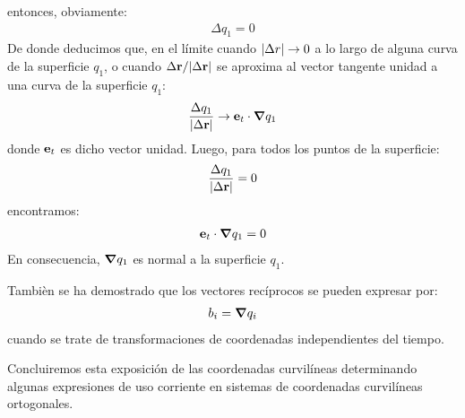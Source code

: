 \documentclass[12pt]{article}
\begin{document}
entonces, obviamente:
\begin{align*}
    \Delta q_{1} = 0
\end{align*}
De donde deducimos que, en el límite cuando $\abs{\Delta r} \to 0$ a lo largo de alguna curva de la superficie $q_{1}$, o cuando $\Delta \vb{r} / \abs{\Delta \vb{r}}$ se aproxima al vector tangente unidad a una curva de la superficie $q_{1}$: 
\begin{align*}
    \dfrac{\Delta q_{1}}{\abs{\Delta \vb{r}}} \to \vb{e}_{t} \cdot \grad{q_{1}}
\end{align*}
donde $\vb{e}_{t}$ es dicho vector unidad. Luego, para todos los puntos de la superficie:
\begin{align*}
    \dfrac{\Delta q_{1}}{\abs{\Delta \vb{r}}} = 0
\end{align*}
encontramos:
\begin{align*}
    \vb{e}_{t} \cdot \grad{q_{1}} = 0
\end{align*}
En consecuencia, $\grad{q_{1}}$ es normal a la superficie $q_{1}$.
\par
Tambièn se ha demostrado que los vectores recíprocos se pueden expresar por:
\begin{align*}
    b_{i} = \grad{q_{i}}
\end{align*}
cuando se trate de transformaciones de coordenadas independientes del tiempo.
\par
Concluiremos esta exposición de las coordenadas curvilíneas determinando algunas expresiones de uso corriente en sistemas de coordenadas curvilíneas ortogonales. 
\end{document}
